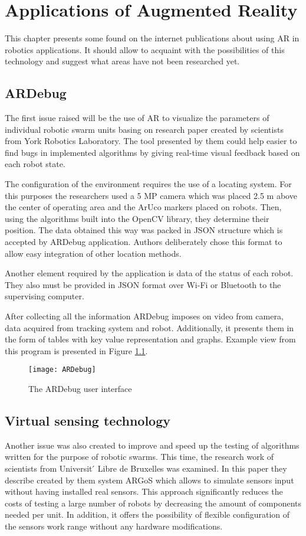 \documentclass[printmode,en]{mgr}
\begin{document}
\chapter{Applications of Augmented Reality}
This chapter presents some found on the internet publications about using AR in robotics applications. It should allow to acquaint with the possibilities of this technology and suggest what areas have not been researched yet.

\section{ARDebug}
The first issue raised will be the use of AR to visualize the parameters of individual robotic swarm units basing on research paper \cite{ARDebug} created by scientists from York Robotics Laboratory. The tool presented by them could help easier to find bugs in implemented algorithms by giving real-time visual feedback based on each robot state.

The configuration of the environment requires the use of a locating system. For this purposes the researchers used a 5 MP camera which was placed 2.5 m above the center of operating area and the ArUco markers placed on robots. Then, using the algorithms built into the OpenCV library, they determine their position. The data obtained this way was packed in JSON structure which is accepted by ARDebug application. Authors deliberately chose this format to allow easy integration of other location methods.

Another element required by the application is data of the status of each robot. They also must be provided in JSON format over Wi-Fi or Bluetooth to the supervising computer.

After collecting all the information ARDebug imposes on video from camera, data acquired from tracking system and robot. Additionally, it presents them in the form of tables with key value representation and graphs. Example view from this program is presented in Figure \ref{fig:ARDebug}.

\begin{figure}[!ht]
  \centering
    \texttt{[image: ARDebug]}
  \caption{The ARDebug user interface \cite{ARDebug}}
  \label{fig:ARDebug}
\end{figure}

\section{Virtual sensing technology}
Another issue was also created to improve and speed up the testing of algorithms written for the purpose of robotic swarms. This time, the research work \cite{ARGoS} of scientists from Universit ́ Libre de Bruxelles was examined. In this paper they describe created by them system ARGoS which allows to simulate sensors input without having installed real sensors. This approach significantly reduces the costs of testing a large number of robots by decreasing the amount of components needed per unit. In addition, it offers the possibility of flexible configuration of the sensors work range without any hardware modifications.
\end{document}
